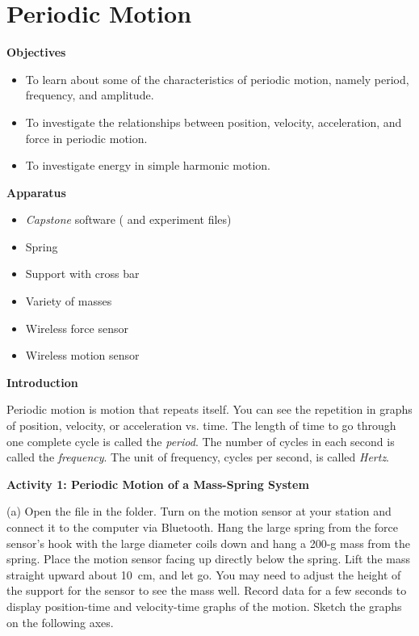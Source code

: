 \section{Periodic Motion}

\makelabheader %

\medskip
\textbf{Objectives }
\begin{itemize}[nosep]
\item To learn about some of the characteristics of periodic motion, namely period, frequency, and amplitude. 
\item To investigate the relationships between position, velocity, acceleration, and force in periodic motion. 
\item To investigate energy in simple harmonic motion.
\end{itemize}

\medskip
\textbf{Apparatus} 
\begin{itemize}[nosep]
\item \textit{Capstone} software ( and  experiment files)
\item Spring
\item Support with cross bar
\item Variety of masses 
\item Wireless force sensor
\item Wireless motion sensor 
\end{itemize}

\medskip
\textbf{Introduction }

Periodic motion is motion that repeats itself. You can see the repetition in
graphs of position, velocity, or acceleration vs. time. The length of time to
go through one complete cycle is called the \textit{period}. The
number of cycles in each second is called the \textit{frequency}. The unit of frequency,
cycles per second, is called \textit{Hertz}.

\bigskip
\textbf{Activity 1: Periodic Motion of a Mass-Spring System} 

(a) Open the file  in the \filename{\coursefolder} folder. Turn on the motion sensor at your station and connect it to the computer via Bluetooth. Hang the large spring from the force sensor's hook with the large diameter coils down and hang a 200-g mass from the spring.  Place the motion sensor facing up directly below the spring. Lift the mass straight upward about 10~cm, and let go.  You may need to adjust the height of the support for the sensor to see the mass well. Record data for a few seconds to display position-time and 
velocity-time graphs of the motion. Sketch the graphs on the following axes.

